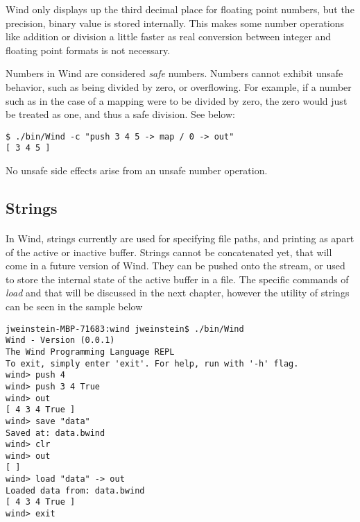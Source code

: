 \par Wind only displays up the third decimal place for floating point numbers, but the precision, binary value is stored internally. This makes some number operations like addition or division a little faster as real conversion between integer and floating point formats is not necessary.
\par Numbers in Wind are considered \emph{safe} numbers. Numbers cannot exhibit unsafe behavior, such as being divided by zero, or overflowing. For example, if a number such as in the case of a mapping were to be divided by zero, the zero would just be treated as one, and thus a safe division. See below:
\begin{verbatim}
$ ./bin/Wind -c "push 3 4 5 -> map / 0 -> out"
[ 3 4 5 ]
\end{verbatim}

No unsafe side effects arise from an unsafe number operation.

\subsection{Strings}

\paragraph{  } In Wind, strings currently are used for specifying file paths, and printing as apart of the active or inactive buffer. Strings cannot be concatenated yet, that will come in a future version of Wind. They can be pushed onto the stream, or used to store the internal state of the active buffer in a file. The specific commands of \emph{load} and  that will be discussed in the next chapter, however the utility of strings can be seen in the sample below

\begin{verbatim}
jweinstein-MBP-71683:wind jweinstein$ ./bin/Wind
Wind - Version (0.0.1)
The Wind Programming Language REPL
To exit, simply enter 'exit'. For help, run with '-h' flag.
wind> push 4
wind> push 3 4 True 
wind> out
[ 4 3 4 True ]
wind> save "data"
Saved at: data.bwind
wind> clr
wind> out
[ ]
wind> load "data" -> out
Loaded data from: data.bwind
[ 4 3 4 True ]
wind> exit
\end{verbatim}

